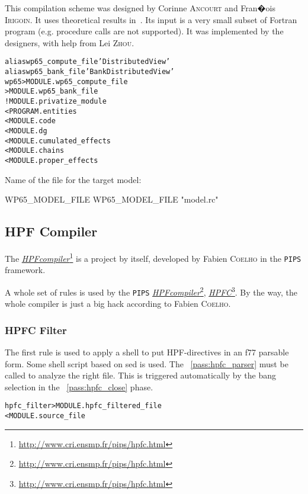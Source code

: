 \documentclass[a4paper]{report}
\newenvironment{PipsMake}{\begin{alltt}}{\end{alltt}}
\newcommand{\PipsPassRef}[1]{\texttt{\detokenize{#1}}~\ref{pass:#1}}
\newenvironment{PipsPass}[1]{\label{pass:#1}}{}
\newcommand{\LINK}[2]{\href{#2}{#1}\footnote{\url{#2}}\xspace}
\newcommand{\HPFC}{\LINK{\emph{HPFC}}{http://www.cri.ensmp.fr/pips/hpfc.html}}
\newcommand{\HPFcompiler}{\LINK{\emph{HPF\space{}compiler}}{http://www.cri.ensmp.fr/pips/hpfc.html}}
\newcommand{\Pips}{\texttt{PIPS}}
\begin{document}
This compilation scheme was designed by Corinne \textsc{Ancourt} and Fran�ois
\textsc{Irigoin}. It uses theoretical results in~\cite{AI91}. Its input is a very
small subset of Fortran program (e.g. procedure calls are not supported).
It was implemented by the designers, with help from Lei \textsc{Zhou}.

\begin{PipsMake}
alias wp65_compute_file 'Distributed View'
alias wp65_bank_file 'Bank Distributed View'
wp65                            > MODULE.wp65_compute_file
                                > MODULE.wp65_bank_file
        ! MODULE.privatize_module
        < PROGRAM.entities
        < MODULE.code
        < MODULE.dg
        < MODULE.cumulated_effects
        < MODULE.chains
        < MODULE.proper_effects

\end{PipsMake}

Name of the file for the target model:
\begin{PipsProp}{WP65_MODEL_FILE}
WP65_MODEL_FILE "model.rc"
\end{PipsProp}

\subsection{HPF Compiler}
\label{subsubsection-hpf-compiler}

The \HPFcompiler{} is a project by itself, developed by Fabien
\textsc{Coelho} in the \Pips{} framework.

A whole set of rules is used by the \Pips{} \HPFcompiler{}, \HPFC{}.  By
the way, the whole compiler is just a big hack according to Fabien
\textsc{Coelho}.

\subsubsection{HPFC Filter}

The first rule is used to apply a shell to put HPF-directives in an f77 parsable form.
Some shell script based on sed is used. The \PipsPassRef{hpfc_parser} must be
called to analyze the right file. This is triggered automatically by the
bang selection in the \PipsPassRef{hpfc_close} phase.
\begin{PipsPass}{hpfc_filter}
\end{PipsPass}

\begin{PipsMake}
hpfc_filter             > MODULE.hpfc_filtered_file
    < MODULE.source_file
\end{PipsMake}
\end{document}
